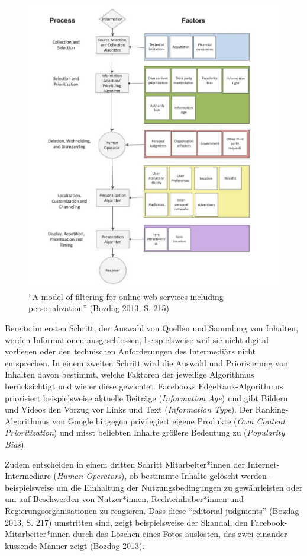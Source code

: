 \documentclass[a4paper,
fontsize=11pt,
oneside,
numbers=noperiodatend,
parskip=half-,
bibliography=totoc,
final
]{scrartcl}
\begin{document}
\begin{figure}
\centering
\includegraphics{img/leyer_abb1.png}
\caption{\enquote{A model of filtering for online web services including
personalization} (Bozdag 2013, S. 215)}
\end{figure}

Bereits im ersten Schritt, der Auswahl von Quellen und Sammlung von
Inhalten, werden Informationen ausgeschlossen, beispielsweise weil sie
nicht digital vorliegen oder den technischen Anforderungen des
Intermediärs nicht entsprechen. In einem zweiten Schritt wird die
Auswahl und Priorisierung von Inhalten davon bestimmt, welche Faktoren
der jeweilige Algorithmus berücksichtigt und wie er diese gewichtet.
Facebooks EdgeRank-Algorithmus priorisiert beispielsweise aktuelle
Beiträge (\emph{Information Age}) und gibt Bildern und Videos den Vorzug
vor Links und Text (\emph{Information Type}). Der Ranking-Algorithmus
von Google hingegen privilegiert eigene Produkte (\emph{Own Content
Prioritization}) und misst beliebten Inhalte größere Bedeutung zu
(\emph{Popularity Bias}).

Zudem entscheiden in einem dritten Schritt Mitarbeiter*innen der
Internet-Intermediäre (\emph{Human Operators}), ob bestimmte Inhalte
gelöscht werden -- beispielsweise um die Einhaltung der
Nutzungsbedingungen zu gewährleisten oder um auf Beschwerden von
Nutzer*innen, Rechteinhaber*innen und Regierungsorganisationen zu
reagieren. Dass diese \enquote{editorial judgments} (Bozdag 2013, S.
217) umstritten sind, zeigt beispielsweise der Skandal, den
Facebook-Mitarbei\-ter*innen durch das Löschen eines Fotos auslösten, das
zwei einander küssende Männer zeigt (Bozdag 2013).
\end{document}
